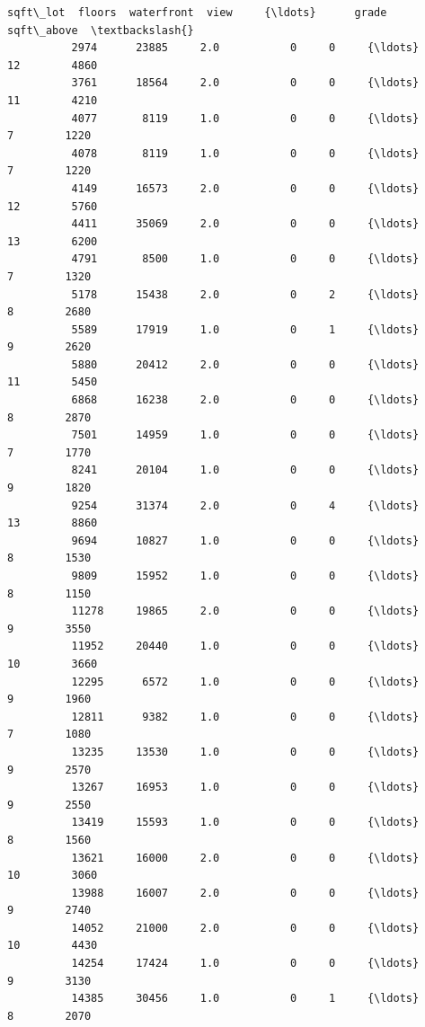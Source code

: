 \documentclass[11pt]{article}
\begin{document}
\begin{Verbatim}[commandchars=\\\{\}]
                 sqft\_lot  floors  waterfront  view     {\ldots}      grade  sqft\_above  \textbackslash{}
          2974      23885     2.0           0     0     {\ldots}         12        4860   
          3761      18564     2.0           0     0     {\ldots}         11        4210   
          4077       8119     1.0           0     0     {\ldots}          7        1220   
          4078       8119     1.0           0     0     {\ldots}          7        1220   
          4149      16573     2.0           0     0     {\ldots}         12        5760   
          4411      35069     2.0           0     0     {\ldots}         13        6200   
          4791       8500     1.0           0     0     {\ldots}          7        1320   
          5178      15438     2.0           0     2     {\ldots}          8        2680   
          5589      17919     1.0           0     1     {\ldots}          9        2620   
          5880      20412     2.0           0     0     {\ldots}         11        5450   
          6868      16238     2.0           0     0     {\ldots}          8        2870   
          7501      14959     1.0           0     0     {\ldots}          7        1770   
          8241      20104     1.0           0     0     {\ldots}          9        1820   
          9254      31374     2.0           0     4     {\ldots}         13        8860   
          9694      10827     1.0           0     0     {\ldots}          8        1530   
          9809      15952     1.0           0     0     {\ldots}          8        1150   
          11278     19865     2.0           0     0     {\ldots}          9        3550   
          11952     20440     1.0           0     0     {\ldots}         10        3660   
          12295      6572     1.0           0     0     {\ldots}          9        1960   
          12811      9382     1.0           0     0     {\ldots}          7        1080   
          13235     13530     1.0           0     0     {\ldots}          9        2570   
          13267     16953     1.0           0     0     {\ldots}          9        2550   
          13419     15593     1.0           0     0     {\ldots}          8        1560   
          13621     16000     2.0           0     0     {\ldots}         10        3060   
          13988     16007     2.0           0     0     {\ldots}          9        2740   
          14052     21000     2.0           0     0     {\ldots}         10        4430   
          14254     17424     1.0           0     0     {\ldots}          9        3130   
          14385     30456     1.0           0     1     {\ldots}          8        2070   

\end{Verbatim}
\end{document}
